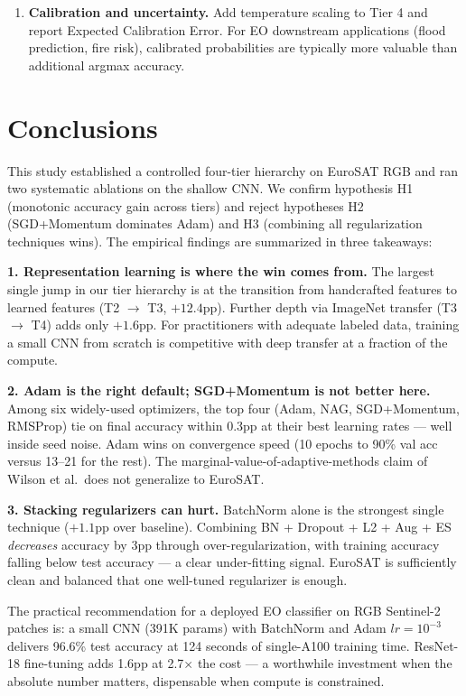 \documentclass[10pt,letterpaper]{article}
\begin{document}
\begin{enumerate}[leftmargin=2em]
    \item \textbf{Calibration and uncertainty.} Add temperature scaling to Tier 4 and report Expected Calibration Error. For EO downstream applications (flood prediction, fire risk), calibrated probabilities are typically more valuable than additional argmax accuracy.
\end{enumerate}

\section{Conclusions}
\label{sec:conclusions}
This study established a controlled four-tier hierarchy on EuroSAT RGB and ran two systematic ablations on the shallow CNN. We confirm hypothesis H1 (monotonic accuracy gain across tiers) and reject hypotheses H2 (SGD+Momentum dominates Adam) and H3 (combining all regularization techniques wins). The empirical findings are summarized in three takeaways:

\textbf{1. Representation learning is where the win comes from.} The largest single jump in our tier hierarchy is at the transition from handcrafted features to learned features (T2 $\rightarrow$ T3, $+12.4$pp). Further depth via ImageNet transfer (T3 $\rightarrow$ T4) adds only $+1.6$pp. For practitioners with adequate labeled data, training a small CNN from scratch is competitive with deep transfer at a fraction of the compute.

\textbf{2. Adam is the right default; SGD+Momentum is not better here.} Among six widely-used optimizers, the top four (Adam, NAG, SGD+Momentum, RMSProp) tie on final accuracy within 0.3pp at their best learning rates --- well inside seed noise. Adam wins on convergence speed (10 epochs to 90\% val acc versus 13--21 for the rest). The marginal-value-of-adaptive-methods claim of Wilson et al.\ does not generalize to EuroSAT.

\textbf{3. Stacking regularizers can hurt.} BatchNorm alone is the strongest single technique ($+1.1$pp over baseline). Combining BN + Dropout + L2 + Aug + ES \emph{decreases} accuracy by 3pp through over-regularization, with training accuracy falling below test accuracy --- a clear under-fitting signal. EuroSAT is sufficiently clean and balanced that one well-tuned regularizer is enough.

The practical recommendation for a deployed EO classifier on RGB Sentinel-2 patches is: a small CNN (391K params) with BatchNorm and Adam $lr{=}10^{-3}$ delivers 96.6\% test accuracy at 124 seconds of single-A100 training time. ResNet-18 fine-tuning adds 1.6pp at 2.7$\times$ the cost --- a worthwhile investment when the absolute number matters, dispensable when compute is constrained.
\end{document}
